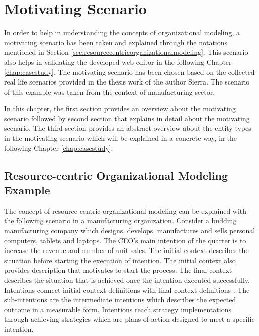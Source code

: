 \chapter{Motivating Scenario}
\label{chap:motivatingScenario}

In order to help in understanding the concepts of organizational modeling, a motivating scenario has been taken and explained through the notations mentioned in Section \ref{sec:resourcecentricorganizationalmodeling}. This scenario also helps in validating the developed web editor in the following Chapter \ref{chap:casestudy}. The motivating scenario has been chosen based on the collected real life scenarios provided in the thesis work of the author Sierra\cite{Sierr2015}. The scenario of this example was taken from the context of manufacturing sector. 

In this chapter, the first section provides an overview about the motivating scenario followed by second section that explains in detail about the motivating scenario. The third section provides an abstract overview about the entity types in the motivating scenario which will be explained in a concrete way, in the following Chapter \ref{chap:casestudy}.

\section{Resource-centric Organizational Modeling Example}
\label{sec:scenario}
 The concept of resource centric organizational modeling can be explained with the following scenario in a manufacturing organization. Consider a budding manufacturing company which designs, develops, manufactures and sells personal computers, tablets and laptops. The CEO's main intention of the quarter is to increase the revenue and number of unit sales. The initial context describes the situation before starting the execution of intention. The initial context also provides description that motivates to start the process. The final context describes the situation that is achieved once the intention executed successfully. Intentions connect initial context definitions with final context definitions \cite{Sungur2014a}. The sub-intentions are the intermediate intentions which describes the expected outcome in a measurable form. Intentions reach strategy implementations through achieving strategies which are plans of action designed to meet a specific intention. 
 
